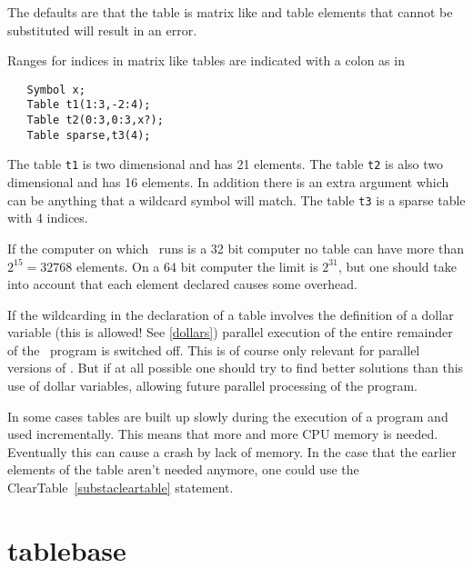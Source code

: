 \vspace{10mm}

\noindent The defaults are that the table is matrix like and table elements 
that cannot be substituted will result in an error.\vspace{4mm}

\noindent Ranges for indices in matrix like tables are indicated with a 
colon as in
\begin{verbatim}
   Symbol x;
   Table t1(1:3,-2:4);
   Table t2(0:3,0:3,x?);
   Table sparse,t3(4);
\end{verbatim}
The table \verb:t1: is two dimensional and has 21 elements. The table 
\verb:t2: is also two dimensional and has 16 elements. In addition there is 
an extra argument which can be anything that a wildcard symbol will match. 
The table \verb:t3: is a sparse table with 4 indices.\vspace{4mm}

\noindent If the computer on which \FORM\ runs is a 32 bit 
computer no table can have more than $2^{15} = 32768$ elements. On a 
64 bit computer the limit is $2^{31}$, but one should take 
into account that each element declared causes some overhead. \vspace{4mm}

\noindent If the wildcarding in the declaration of a table involves the 
definition of a dollar variable (this is allowed! See 
\ref{dollars}) parallel execution of the entire remainder of the \FORM\ 
program is switched off. This is of course only relevant for parallel 
versions of \FORM. But if at all possible one should try to find better 
solutions than this use of dollar variables, allowing future parallel 
processing of the program.

\noindent In some cases tables are built up slowly during the execution of 
a program and used incrementally. This means that more and more CPU memory 
is needed. Eventually this can cause a crash by lack of memory. In the case 
that the earlier elements of the table aren't needed anymore, one could use 
the ClearTable~\ref{substacleartable} statement.
\vspace{10mm}


\section{tablebase}
\label{substatablebase}

